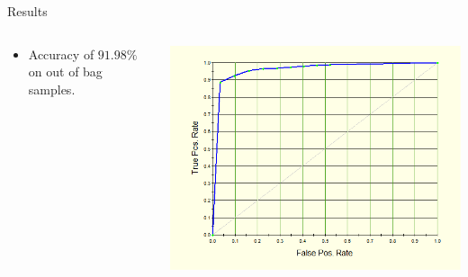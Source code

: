 \documentclass[10pt]{beamer}
\begin{document}
\begin{frame}{Results}
\begin{columns}[T]
    \begin{column}{.35 \textwidth}
        \begin{itemize}
            \item Accuracy of $91.98\%$ on out of bag samples. 
        \end{itemize}
    \end{column}
    
    \begin{column}{.65\textwidth}
    \begin{center}
        \includegraphics[width = \textwidth]{ROCcurveOOB.png}
    \end{center}
    \end{column}
\end{columns}
\end{frame}
\end{document}
